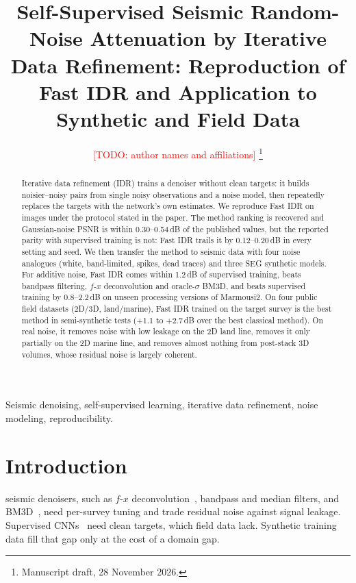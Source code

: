 \documentclass[journal]{IEEEtran}
\newcommand{\todo}[1]{\textcolor{red}{[TODO: #1]}}
\begin{document}
\title{Self-Supervised Seismic Random-Noise Attenuation by Iterative Data Refinement: Reproduction of Fast IDR and Application to Synthetic and Field Data}

\author{\todo{author names and affiliations}%
\thanks{Manuscript draft, 28 November 2026.}}

\maketitle

\begin{abstract}
Iterative data refinement (IDR) trains a denoiser without clean targets: it builds noisier--noisy pairs from single noisy observations and a noise model, then repeatedly replaces the targets with the network's own estimates. We reproduce Fast IDR on images under the protocol stated in the paper. The method ranking is recovered and Gaussian-noise PSNR is within 0.30--0.54\,dB of the published values, but the reported parity with supervised training is not: Fast IDR trails it by 0.12--0.20\,dB in every setting and seed. We then transfer the method to seismic data with four noise analogues (white, band-limited, spikes, dead traces) and three SEG synthetic models. For additive noise, Fast IDR comes within 1.2\,dB of supervised training, beats bandpass filtering, $f$-$x$ deconvolution and oracle-$\sigma$ BM3D, and beats supervised training by 0.8--2.2\,dB on unseen processing versions of Marmousi2. On four public field datasets (2D/3D, land/marine), Fast IDR trained on the target survey is the best method in semi-synthetic tests (+1.1 to +2.7\,dB over the best classical method). On real noise, it removes noise with low leakage on the 2D land line, removes it only partially on the 2D marine line, and removes almost nothing from post-stack 3D volumes, whose residual noise is largely coherent.
\end{abstract}

\begin{IEEEkeywords}
Seismic denoising, self-supervised learning, iterative data refinement, noise modeling, reproducibility.
\end{IEEEkeywords}

\section{Introduction}
 seismic denoisers, such as $f$-$x$ deconvolution~\cite{canales1984fx}, bandpass and median filters, and BM3D~\cite{dabov2007bm3d,makinen2020bm3d}, need per-survey tuning and trade residual noise against signal leakage. Supervised CNNs~\cite{zhang2017dncnn,yu2019dnseis} need clean targets, which field data lack. Synthetic training data fill that gap only at the cost of a domain gap.
\end{document}

